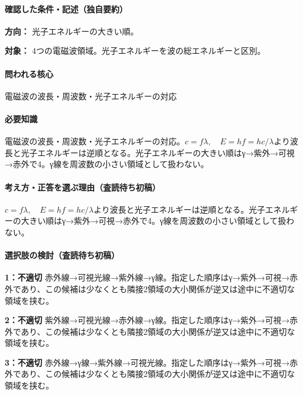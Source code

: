 \paragraph{確認した条件・記述（独自要約）}\mbox{}\par

\noindent\textbf{方向：} 光子エネルギーの大きい順。\par

\noindent\textbf{対象：} 4つの電磁波領域。光子エネルギーを波の総エネルギーと区別。\par

\paragraph{問われる核心} 電磁波の波長・周波数・光子エネルギーの対応

\paragraph{必要知識} 電磁波の波長・周波数・光子エネルギーの対応。\(c=f\lambda,\quad E=hf=hc/\lambda\)より波長と光子エネルギーは逆順となる。光子エネルギーの大きい順はγ→紫外→可視→赤外で4。γ線を周波数の小さい領域として扱わない。

\paragraph{考え方・正答を選ぶ理由（査読待ち初稿）} \(c=f\lambda,\quad E=hf=hc/\lambda\)より波長と光子エネルギーは逆順となる。光子エネルギーの大きい順はγ→紫外→可視→赤外で4。γ線を周波数の小さい領域として扱わない。

\paragraph{選択肢の検討（査読待ち初稿）}\mbox{}\par

\noindent\textbf{1：不適切} 赤外線→可視光線→紫外線→γ線。指定した順序はγ→紫外→可視→赤外であり、この候補は少なくとも隣接2領域の大小関係が逆又は途中に不適切な領域を挟む。\par

\noindent\textbf{2：不適切} 紫外線→可視光線→赤外線→γ線。指定した順序はγ→紫外→可視→赤外であり、この候補は少なくとも隣接2領域の大小関係が逆又は途中に不適切な領域を挟む。\par

\noindent\textbf{3：不適切} 赤外線→γ線→紫外線→可視光線。指定した順序はγ→紫外→可視→赤外であり、この候補は少なくとも隣接2領域の大小関係が逆又は途中に不適切な領域を挟む。\par

